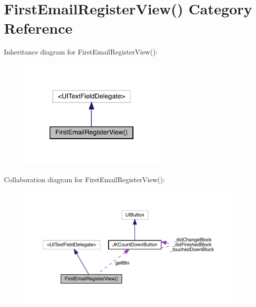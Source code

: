 \hypertarget{category_first_email_register_view_07_08}{}\section{First\+Email\+Register\+View() Category Reference}
\label{category_first_email_register_view_07_08}


Inheritance diagram for First\+Email\+Register\+View()\+:\nopagebreak
\begin{figure}[H]
\begin{center}
\leavevmode
\includegraphics[width=206pt]{category_first_email_register_view_07_08__inherit__graph}
\end{center}
\end{figure}


Collaboration diagram for First\+Email\+Register\+View()\+:\nopagebreak
\begin{figure}[H]
\begin{center}
\leavevmode
\includegraphics[width=350pt]{category_first_email_register_view_07_08__coll__graph}
\end{center}
\end{figure}
